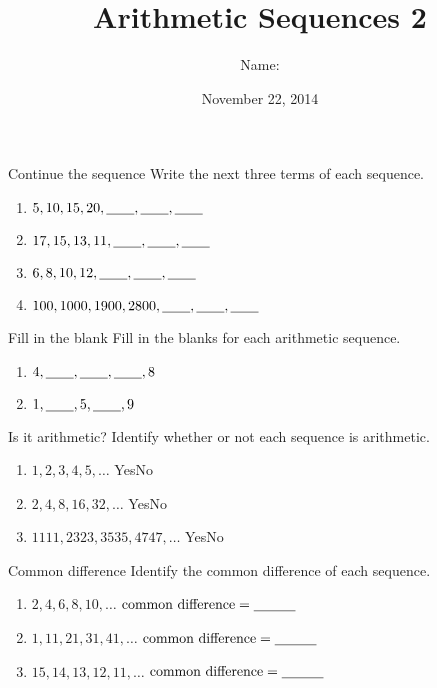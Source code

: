 \documentclass[12pt,letterpaper]{article}
\title{Arithmetic Sequences 2}
\author{Name: \underline{\hspace{5cm}}}
\date{November 22, 2014}
\begin{document}
\maketitle

\thispagestyle{empty}

\begin{problem}{Continue the sequence}
 Write the next three terms of each sequence.

 \begin{enumerate}[\hspace{.5cm}a.]
  \item $5, 10, 15, 20, \underline{\hspace{2em}}, \underline{\hspace{2em}}, \underline{\hspace{2em}}$
  \item $17, 15, 13, 11, \underline{\hspace{2em}}, \underline{\hspace{2em}}, \underline{\hspace{2em}}$
  \item $6, 8, 10, 12, \underline{\hspace{2em}}, \underline{\hspace{2em}}, \underline{\hspace{2em}}$
  \item $100, 1000, 1900, 2800, \underline{\hspace{2em}}, \underline{\hspace{2em}}, \underline{\hspace{2em}}$
 \end{enumerate}
\end{problem}

\begin{problem}{Fill in the blank}
 Fill in the blanks for each arithmetic sequence.

 \begin{enumerate}[\hspace{.5cm}a.]
  \item $4, \underline{\hspace{2em}}, \underline{\hspace{2em}}, \underline{\hspace{2em}}, 8$
  \item $1, \underline{\hspace{2em}}, 5, \underline{\hspace{2em}}, 9$
 \end{enumerate}
\end{problem}

\begin{problem}{Is it arithmetic?}
 Identify whether or not each sequence is arithmetic.

 \begin{enumerate}[\hspace{.5cm}a.]
  \item $1, 2, 3, 4, 5, \ldots$ \hfill Yes\hspace{3em}No
  \item $2, 4, 8, 16, 32, \ldots$ \hfill Yes\hspace{3em}No
  \item $1111, 2323, 3535, 4747, \ldots$ \hfill Yes\hspace{3em}No
 \end{enumerate}
\end{problem}

\begin{problem}{Common difference}
 Identify the common difference of each sequence.

 \begin{enumerate}[\hspace{.5cm}a.]
  \item $2, 4, 6, 8, 10, \ldots$ \hfill $\text{common difference} = \underline{\hspace{3em}}$
  \item $1, 11, 21, 31, 41, \ldots$ \hfill $\text{common difference} = \underline{\hspace{3em}}$
  \item $15, 14, 13, 12,
  11, \ldots$ \hfill $\text{common difference} = \underline{\hspace{3em}}$
 \end{enumerate}
\end{problem}
\end{document}
